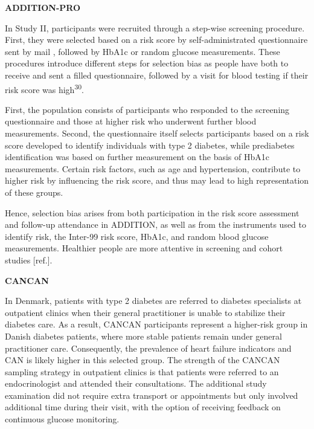 \documentclass[
  a4paper,
  headsepline=true,
  open=any]{scrbook}
\begin{document}
\textbf{ADDITION-PRO}

In Study II, participants were recruited through a step-wise screening
procedure. First, they were selected based on a risk score by
self-administrated questionnaire sent by mail , followed by HbA1c or
random glucose measurements. These procedures introduce different steps
for selection bias as people have both to receive and sent a filled
questionnaire, followed by a visit for blood testing if their risk score
was high\textsuperscript{30}.

First, the population consists of participants who responded to the
screening questionnaire and those at higher risk who underwent further
blood measurements. Second, the questionnaire itself selects
participants based on a risk score developed to identify individuals
with type 2 diabetes, while prediabetes identification was based on
further measurement on the basis of HbA1c measurements. Certain risk
factors, such as age and hypertension, contribute to higher risk by
influencing the risk score, and thus may lead to high representation of
these groups.

Hence, selection bias arises from both participation in the risk score
assessment and follow-up attendance in ADDITION, as well as from the
instruments used to identify risk, the Inter-99 risk score, HbA1c, and
random blood glucose measurements. Healthier people are more attentive
in screening and cohort studies {[}ref.{]}.

\textbf{CANCAN}

In Denmark, patients with type 2 diabetes are referred to diabetes
specialists at outpatient clinics when their general practitioner is
unable to stabilize their diabetes care. As a result, CANCAN
participants represent a higher-risk group in Danish diabetes patients,
where more stable patients remain under general practitioner care.
Consequently, the prevalence of heart failure indicators and CAN is
likely higher in this selected group. The strength of the CANCAN
sampling strategy in outpatient clinics is that patients were referred
to an endocrinologist and attended their consultations. The additional
study examination did not require extra transport or appointments but
only involved additional time during their visit, with the option of
receiving feedback on continuous glucose monitoring.
\end{document}
